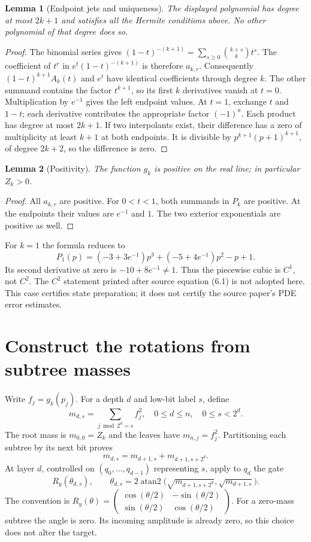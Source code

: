 \documentclass[11pt]{article}
\newtheorem{lemma}{Lemma}
\DeclareMathOperator{\atanTwo}{atan2}
\begin{document}
\begin{lemma}[Endpoint jets and uniqueness]
The displayed polynomial has degree at most $2k+1$ and satisfies all the
Hermite conditions above. No other polynomial of that degree does so.
\end{lemma}
\begin{proof}
The binomial series gives
$(1-t)^{-(k+1)}=\sum_{s\geq0}\binom{k+s}{k}t^s$.
The coefficient of $t^r$ in $e^t(1-t)^{-(k+1)}$ is therefore $a_{k,r}$.
Consequently $(1-t)^{k+1}A_k(t)$ and $e^t$ have identical coefficients
through degree $k$. The other summand contains the factor $t^{k+1}$,
so its first $k$ derivatives vanish at $t=0$. Multiplication by $e^{-1}$
gives the left endpoint values. At $t=1$, exchange $t$ and $1-t$;
each derivative contributes the appropriate factor $(-1)^a$.
Each product has degree at most $2k+1$.
If two interpolants exist, their difference has a zero of multiplicity
at least $k+1$ at both endpoints. It is divisible by
$p^{k+1}(p+1)^{k+1}$, of degree $2k+2$, so the difference is zero.
\end{proof}

\begin{lemma}[Positivity]
The function $g_k$ is positive on the real line; in particular $Z_k>0$.
\end{lemma}
\begin{proof}
All $a_{k,r}$ are positive. For $0<t<1$, both summands in $P_k$ are
positive. At the endpoints their values are $e^{-1}$ and $1$.
The two exterior exponentials are positive as well.
\end{proof}

For $k=1$ the formula reduces to
\[
P_1(p)=(-3+3e^{-1})p^3+(-5+4e^{-1})p^2-p+1.
\]
Its second derivative at zero is $-10+8e^{-1}\ne1$.
Thus the piecewise cubic is $C^1$, not $C^2$. The $C^2$ statement printed
after source equation (6.1) is not adopted here. This case certifies state
preparation; it does not certify the source paper's PDE error estimates.

\section{Construct the rotations from subtree masses}
Write $f_j=g_k(p_j)$. For a depth $d$ and low-bit label $s$, define
\[
m_{d,s}=\sum_{j\bmod 2^d=s}f_j^2,
\quad 0\leq d\leq n,\quad 0\leq s<2^d.
\]
The root mass is $m_{0,0}=Z_k$ and the leaves have $m_{n,j}=f_j^2$.
Partitioning each subtree by its next bit proves
\[
m_{d,s}=m_{d+1,s}+m_{d+1,s+2^d}.
\]
At layer $d$, controlled on $(q_0,\ldots,q_{d-1})$ representing $s$,
apply to $q_d$ the gate
\[
R_y(\theta_{d,s}),\qquad
\theta_{d,s}=2\atanTwo\bigl(\sqrt{m_{d+1,s+2^d}},
                                  \sqrt{m_{d+1,s}}\bigr).
\]
The convention is $R_y(\theta)=
\begin{pmatrix}\cos(\theta/2)&-\sin(\theta/2)\\
\sin(\theta/2)&\cos(\theta/2)\end{pmatrix}$.
For a zero-mass subtree the angle is zero. Its incoming amplitude is already
zero, so this choice does not alter the target.
\end{document}
